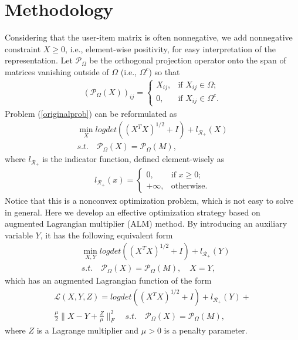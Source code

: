 \documentclass[letterpaper]{article}
\begin{document}
\section{Methodology}
 Considering that the user-item matrix is often nonnegative, we add nonnegative constraint $X\ge 0$, i.e., element-wise positivity, for easy interpretation of the representation. Let $\mathcal{P}_\Omega$ be the orthogonal projection operator onto the span of matrices vanishing outside of $\Omega$ (i.e., $\Omega^c$) so that
\begin{eqnarray*}
(\mathcal{P}_\Omega(X))_{ij}=\left\{
\begin{array}{ll} X_{ij}, & \mbox{if $X_{ij}\in\Omega$};\\
0, & \mbox{if $X_{ij}\in\Omega^c$.}
\end{array}\right.
\end{eqnarray*}
Problem (\ref{originalprob}) can be reformulated as
\begin{equation}
\begin{split}
\min_X logdet ((X^TX)^{1/2}+I)+l_{\mathcal{R}_+}(X)   \\
s.t.\quad \mathcal{P}_\Omega(X)=\mathcal{P}_\Omega(M),
\end{split}
\end{equation}
where $l_{\mathcal{R}_+}$ is the indicator function, defined element-wisely as
\begin{eqnarray*}
\label{error21}
l_{\mathcal{R}_+}(x)=\left\{
\begin{array}{ll} 0, & \mbox{if $x\geq 0$};\\
+\infty, & \mbox{otherwise.}
\end{array}\right.
\end{eqnarray*}
Notice that this is a nonconvex optimization problem, which is not easy to solve in general. Here we develop an effective optimization strategy based on augmented Lagrangian
multiplier (ALM) method. By introducing an auxiliary variable $Y$, it has the following equivalent form
\begin{equation}
\label{secondprob}
\begin{split}
&\min_{X, Y} logdet ((X^TX)^{1/2}+I)+l_{\mathcal{R}_+}(Y)   \\
&s.t.\quad \mathcal{P}_\Omega(X)=\mathcal{P}_\Omega(M),\quad X=Y,
\end{split}
\end{equation}
which has an augmented Lagrangian function of the form
\begin{equation}
\begin{split}
\mathcal{L}(X,Y,Z)= logdet ((X^TX)^{1/2}+I)+l_{\mathcal{R}_+}(Y)+\\
\frac{\mu}{2}\|X-Y+\frac{Z}{\mu}\|_F^2
\quad s.t.\quad \mathcal{P}_\Omega(X)=\mathcal{P}_\Omega(M),
\end{split}
\end{equation}
where $Z$ is a Lagrange multiplier and $\mu>0$ is a penalty parameter.
\end{document}
